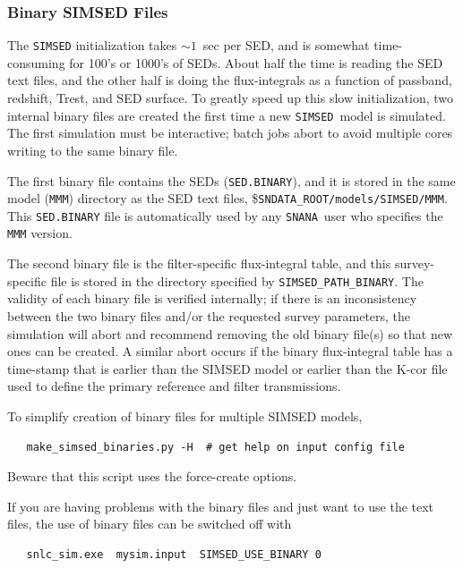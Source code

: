 \documentclass[12pt]{article}
\newcommand{\SIMSED}{{\tt SIMSED}}
\newcommand{\snana}{{\tt SNANA}}
\begin{document}
\subsubsection{Binary SIMSED Files}
\label{sss:simsed_binary}

The {\tt SIMSED} initialization takes ${\sim}1$~sec per SED, 
and is somewhat time-consuming for 100's or 1000's of SEDs. 
About half the time is reading the SED text files, and the other half 
is doing the flux-integrals as a function of passband,
redshift, Trest, and SED surface. 
To greatly speed up this slow initialization,
two internal binary files are created
the first time a new \SIMSED\ model is simulated.
The first simulation must be interactive; batch jobs abort to 
avoid multiple cores writing to the same binary file.

The first binary file contains the SEDs ({\tt SED.BINARY}), 
and it is stored in the same model ({\tt MMM}) directory
as the SED text files,
\${\tt SNDATA\_ROOT/models/SIMSED/MMM}.
This {\tt SED.BINARY} file is automatically used
by any \snana\ user who specifies the {\tt MMM} version.


The second binary file is the filter-specific flux-integral table, 
and this survey-specific file is stored in the directory specified by 
{\tt SIMSED\_PATH\_BINARY}.
The validity of each binary file is verified internally; 
if there is an inconsistency between the two binary files
and/or the requested survey parameters, the simulation will 
abort and recommend removing the old binary file(s) so that
new ones can be created. A similar abort occurs if
the binary flux-integral table has a time-stamp
that is earlier than the SIMSED model or earlier than
the K-cor file used to define the primary reference
and filter transmissions.

To simplify creation of binary files for multiple SIMSED models,
\vspace{-2mm}
\begin{verbatim}
   make_simsed_binaries.py -H  # get help on input config file
\end{verbatim}
\vspace{-2mm}
Beware that this script uses the force-create options.

If you are having problems with the binary files and just
want to use the text files, the use of binary files can
be switched off with
\begin{verbatim}
   snlc_sim.exe  mysim.input  SIMSED_USE_BINARY 0
\end{verbatim}
\end{document}
